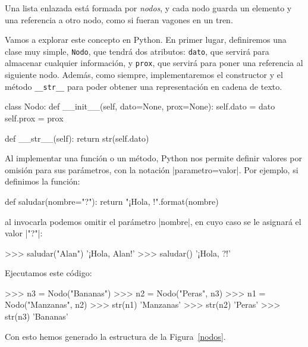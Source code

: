 Una lista enlazada está formada por \emph{nodos}, y cada nodo guarda
un elemento y una referencia a otro nodo, como si fueran vagones en un tren.

Vamos a explorar este concepto en Python.
En primer lugar, definiremos una clase muy simple, \lstinline!Nodo!, que
tendrá dos atributos: \lstinline!dato!, que
servirá para almacenar cualquier información, y \lstinline!prox!, que servirá
para poner una referencia al siguiente nodo.
Además, como siempre, implementaremos el constructor y el método
\lstinline!__str__! para poder obtener una representación en cadena de texto.

\begin{codigo-python-sn}
class Nodo:
    def __init__(self, dato=None, prox=None):
        self.dato = dato
        self.prox = prox

    def __str__(self):
        return str(self.dato)
\end{codigo-python-sn}

\begin{sabias_que}
Al implementar una función o un método, Python nos permite definir valores por
omisión para sus parámetros, con la notación |parametro=valor|. Por ejemplo, si
definimos la función:

\begin{codigo-python-sn}
def saludar(nombre="?"):
    return "¡Hola, {}!".format(nombre)
\end{codigo-python-sn}

\noindent al invocarla podemos omitir el parámetro |nombre|, en cuyo caso se le
asignará el valor |"?"|:

\begin{codigo-python-sn}
>>> saludar("Alan")
'¡Hola, Alan!'
>>> saludar()
'¡Hola, ?!'
\end{codigo-python-sn}
\end{sabias_que}

Ejecutamos este código:

\begin{codigo-python-sn}
>>> n3 = Nodo("Bananas")
>>> n2 = Nodo("Peras", n3)
>>> n1 = Nodo("Manzanas", n2)
>>> str(n1)
'Manzanas'
>>> str(n2)
'Peras'
>>> str(n3)
'Bananas'
\end{codigo-python-sn}

Con esto hemos generado la estructura de la Figura~\ref{nodos}.

